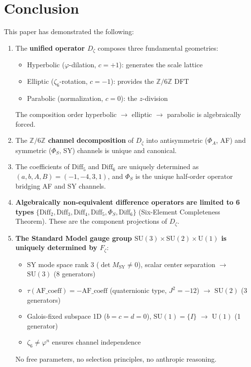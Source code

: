 \chapter{Conclusion}
\label{chap:conclusion}

This paper has demonstrated the following:

\begin{enumerate}
\item The \textbf{unified operator $D_\zeta$} composes three fundamental geometries:
  \begin{itemize}
  \item Hyperbolic ($\varphi$-dilation, $c = +1$): generates the scale lattice
  \item Elliptic ($\zeta_6$-rotation, $c = -1$): provides the $\mathbb{Z}/6\mathbb{Z}$ DFT
  \item Parabolic (normalization, $c = 0$): the $z$-division
  \end{itemize}
  The composition order hyperbolic $\to$ elliptic $\to$ parabolic is algebraically forced.

\item The \textbf{$\mathbb{Z}/6\mathbb{Z}$ channel decomposition} of $D_\zeta$ into antisymmetric ($\Phi_A$, AF) and symmetric ($\Phi_S$, SY) channels is unique and canonical.

\item The coefficients of $\mathrm{Diff}_5$ and $\mathrm{Diff}_6$ are uniquely determined as $(a,b,A,B)=(-1,-4,3,1)$, and $\Phi_S$ is the unique half-order operator bridging AF and SY channels.

\item \textbf{Algebraically non-equivalent difference operators are limited to 6 types} $\{\mathrm{Diff}_2, \mathrm{Diff}_3, \mathrm{Diff}_4, \mathrm{Diff}_5, \Phi_S, \mathrm{Diff}_6\}$ (Six-Element Completeness Theorem). These are the component projections of $D_\zeta$.

\item \textbf{The Standard Model gauge group $\mathrm{SU}(3) \times \mathrm{SU}(2) \times \mathrm{U}(1)$ is uniquely determined by $F_\zeta$}:
  \begin{itemize}
  \item SY mode space rank 3 ($\det M_{\mathrm{SY}} \neq 0$), scalar center separation $\to$ $\mathrm{SU}(3)$ (8 generators)
  \item $\tau(\mathrm{AF\_coeff}) = -\mathrm{AF\_coeff}$ (quaternionic type, $J^2 = -12$) $\to$ $\mathrm{SU}(2)$ (3 generators)
  \item Galois-fixed subspace 1D ($b = c = d = 0$), $\mathrm{SU}(1) = \{I\}$ $\to$ $\mathrm{U}(1)$ (1 generator)
  \item $\zeta_6 \neq \varphi^n$ ensures channel independence
  \end{itemize}
  No free parameters, no selection principles, no anthropic reasoning.


\end{enumerate}
